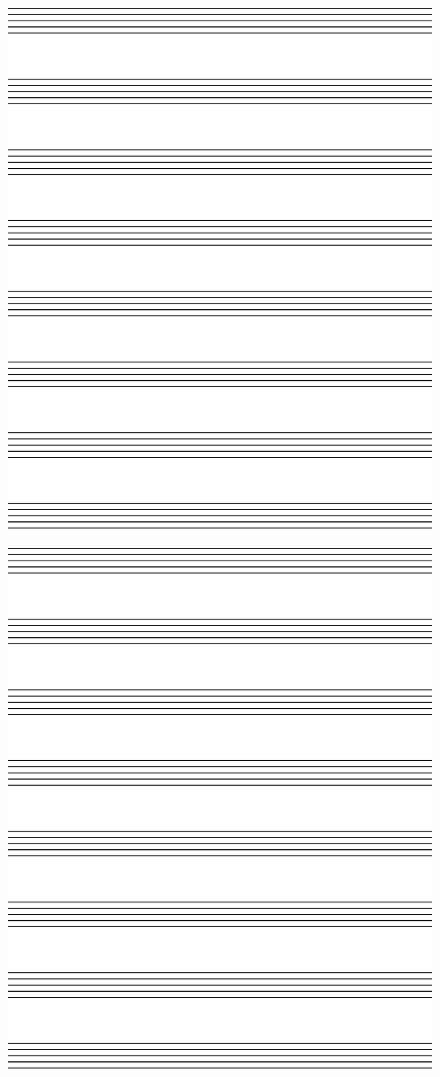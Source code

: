 \begin{figure}
\centering
\includegraphics[width=7.5in]{graphics/staves.eps}
\end{figure}

\begin{figure}
\centering
\includegraphics[width=7.5in]{graphics/staves.eps}
\end{figure}


\cleardoublepage



